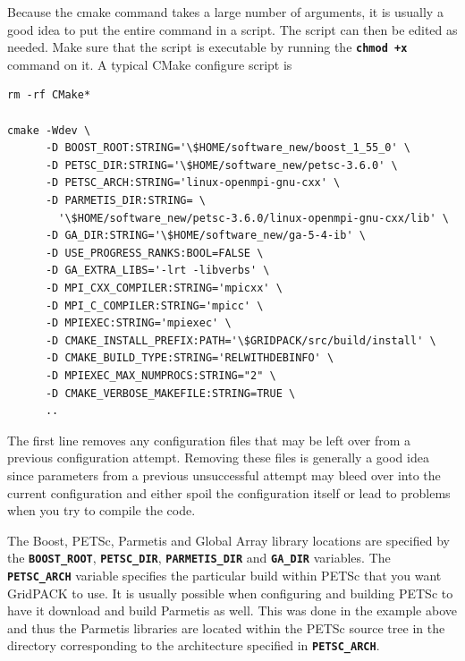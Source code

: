 \documentclass[12pt]{report} %
\begin{document}
Because the cmake command takes a large number of arguments, it is usually a good idea to put the entire command in a script. The script can then be edited as needed. Make sure that the script is executable by running the \texttt{\textbf{chmod +x}} command on it. A typical CMake configure script is

{
\color{red}
\begin{Verbatim}[fontseries=b]
rm -rf CMake*

cmake -Wdev \
      -D BOOST_ROOT:STRING='\$HOME/software_new/boost_1_55_0' \
      -D PETSC_DIR:STRING='\$HOME/software_new/petsc-3.6.0' \
      -D PETSC_ARCH:STRING='linux-openmpi-gnu-cxx' \
      -D PARMETIS_DIR:STRING= \
        '\$HOME/software_new/petsc-3.6.0/linux-openmpi-gnu-cxx/lib' \
      -D GA_DIR:STRING='\$HOME/software_new/ga-5-4-ib' \
      -D USE_PROGRESS_RANKS:BOOL=FALSE \
      -D GA_EXTRA_LIBS='-lrt -libverbs' \
      -D MPI_CXX_COMPILER:STRING='mpicxx' \
      -D MPI_C_COMPILER:STRING='mpicc' \
      -D MPIEXEC:STRING='mpiexec' \
      -D CMAKE_INSTALL_PREFIX:PATH='\$GRIDPACK/src/build/install' \
      -D CMAKE_BUILD_TYPE:STRING='RELWITHDEBINFO' \
      -D MPIEXEC_MAX_NUMPROCS:STRING="2" \
      -D CMAKE_VERBOSE_MAKEFILE:STRING=TRUE \
      ..
\end{Verbatim}
}

The first line removes any configuration files that may be left over from a previous configuration attempt. Removing these files is generally a good idea since parameters from a previous unsuccessful attempt may bleed over into the current configuration and either spoil the configuration itself or lead to problems when you try to compile the code. 

The Boost, PETSc, Parmetis and Global Array library locations are specified by the \texttt{\textbf{BOOST\_ROOT}}, \texttt{\textbf{PETSC\_DIR}}, \texttt{\textbf{PARMETIS\_DIR}} and \texttt{\textbf{GA\_DIR}} variables. The \texttt{\textbf{PETSC\_ARCH}} variable specifies the particular build within PETSc that you want GridPACK to use. It is usually possible when configuring and building PETSc to have it download and build Parmetis as well. This was done in the example above and thus the Parmetis libraries are located within the PETSc source tree in the directory corresponding to the architecture specified in \texttt{\textbf{PETSC\_ARCH}}.
\end{document}

